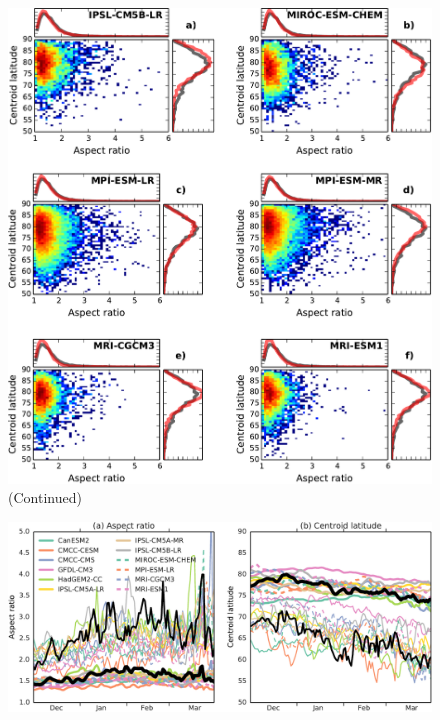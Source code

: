  \begin{figure}
 \ContinuedFloat
 \centering
 \noindent\includegraphics[width=\textwidth]{figures/chapter-models/moments_stats2.pdf}
 \caption[]{(Continued)}
 \label{Fig2}
 \end{figure}
 
\begin{figure}
 \centering
 \noindent\includegraphics[width=\textwidth]{figures/chapter-models/moments_seasonal_stats.pdf}
 \caption[]{}
 \label{Fig2}
 \end{figure}




